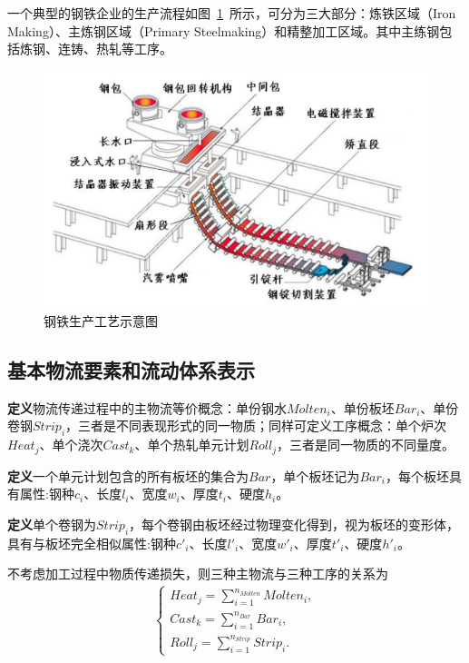 \documentclass{whutmod}
\begin{document}
	 一个典型的钢铁企业的生产流程如图~\ref{1111ss11}~所示，可分为三大部分：炼铁区域（Iron Making）、主炼钢区域（Primary Steelmaking）和精整加工区域。其中主练钢包括炼钢、连铸、热轧等工序。
	\begin{figure}[H]
		\centering
		\includegraphics[width=.9\textwidth]{figures/sda.png}
		\caption{钢铁生产工艺示意图}\label{1111ss11}
	\end{figure}

		
\subsection{基本物流要素和流动体系表示}


\textbf{定义}物流传递过程中的主物流等价概念：单份钢水$Molten_i$、单份板坯$Bar_i$、单份卷钢$Strip_i$，三者是不同表现形式的同一物质；同样可定义工序概念：单个炉次$Heat_j$、单个浇次$Cast_k$、单个热轧单元计划$Roll_j$，三者是同一物质的不同量度。
\vspace{7pt}	%
		
\textbf{定义}一个单元计划包含的所有板坯的集合为$Bar$，单个板坯记为$Bar_i$，每个板坯具有属性:钢种$c_i$、长度$l_i$、宽度$w_i$、厚度$t_i$、硬度$h_i$。
		\vspace{7pt}	%
		
\textbf{定义}单个卷钢为$Strip_i$，每个卷钢由板坯经过物理变化得到，视为板坯的变形体，具有与板坯完全相似属性:钢种$c'_i$、长度$l'_i$、宽度$w'_i$、厚度$t'_i$、硬度$h'_i$。

不考虑加工过程中物质传递损失，则三种主物流与三种工序的关系为
\begin{gather}
\left\{\begin{matrix}
Heat_j=\sum_{i=1}^{n_{Molten}}Molten_i,
\\Cast_k=\sum_{i=1}^{n_{Bar}}Bar_i,
\\ Roll_j=\sum_{i=1}^{n_{Strip}}Strip_i.
\end{matrix}\right.
\end{gather}
\end{document}
